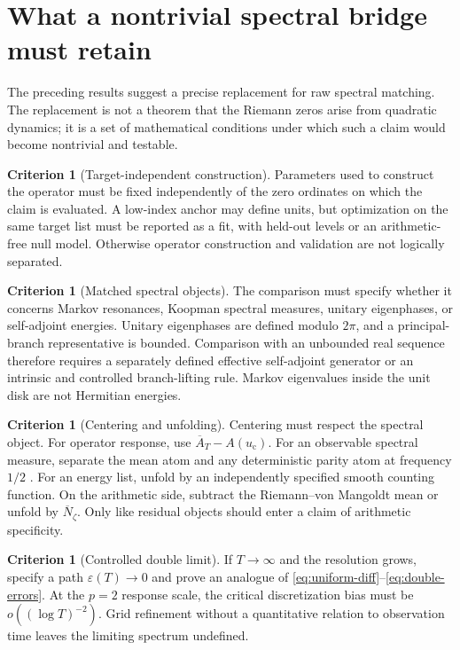 \documentclass[11pt]{article}
\theoremstyle{definition}
\newtheorem{criterion}[theorem]{Criterion}
\theoremstyle{remark}
\newcommand{\uc}{u_{\mathrm c}}
\begin{document}
\section{What a nontrivial spectral bridge must retain}\label{sec:criteria}

The preceding results suggest a precise replacement for raw spectral matching.  The replacement is not a theorem that the Riemann zeros arise from quadratic dynamics; it is a set of mathematical conditions under which such a claim would become nontrivial and testable.

\begin{criterion}[Target-independent construction]\label{crit:target-free}
Parameters used to construct the operator must be fixed independently of the zero ordinates on which the claim is evaluated.  A low-index anchor may define units, but optimization on the same target list must be reported as a fit, with held-out levels or an arithmetic-free null model.  Otherwise operator construction and validation are not logically separated.
\end{criterion}

\begin{criterion}[Matched spectral objects]\label{crit:objects}
The comparison must specify whether it concerns Markov resonances, Koopman spectral measures, unitary eigenphases, or self-adjoint energies.  Unitary eigenphases are defined modulo $2\pi$, and a principal-branch representative is bounded.  Comparison with an unbounded real sequence therefore requires a separately defined effective self-adjoint generator or an intrinsic and controlled branch-lifting rule.  Markov eigenvalues inside the unit disk are not Hermitian energies.
\end{criterion}

\begin{criterion}[Centering and unfolding]\label{crit:center}
Centering must respect the spectral object.  For operator response, use $\overline A_T-A(\uc)$.  For an observable spectral measure, separate the mean atom and any deterministic parity atom at frequency $1/2$ \citep{WangParity2026}.  For an energy list, unfold by an independently specified smooth counting function.  On the arithmetic side, subtract the Riemann--von Mangoldt mean or unfold by $\overline N_\zeta$.  Only like residual objects should enter a claim of arithmetic specificity.
\end{criterion}

\begin{criterion}[Controlled double limit]\label{crit:double}
If $T\to\infty$ and the resolution grows, specify a path $\varepsilon(T)\to0$ and prove an analogue of \eqref{eq:uniform-diff}--\eqref{eq:double-errors}.  At the $p=2$ response scale, the critical discretization bias must be $o((\log T)^{-2})$.  Grid refinement without a quantitative relation to observation time leaves the limiting spectrum undefined.
\end{criterion}
\end{document}
